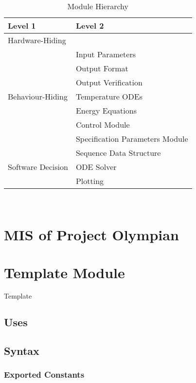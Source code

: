 \documentclass[12pt, titlepage]{article}
\begin{document}
\begin{table}[h!]
\centering
\begin{tabular}{p{} p{}}
\toprule
\textbf{Level 1} & \textbf{Level 2}\\
\midrule

{Hardware-Hiding} & ~ \\
\midrule

\multirow{7}{0.3\textwidth}{Behaviour-Hiding} & Input Parameters\\
& Output Format\\
& Output Verification\\
& Temperature ODEs\\
& Energy Equations\\ 
& Control Module\\
& Specification Parameters Module\\
\midrule

\multirow{3}{0.3\textwidth}{Software Decision} & {Sequence Data Structure}\\
& ODE Solver\\
& Plotting\\
\bottomrule

\end{tabular}
\caption{Module Hierarchy}
\label{TblMH}
\end{table}

\newpage
~\newpage

\section{MIS of Project Olympian} \label{Template} 

\section{Template Module}

Template

\subsection{Uses}

\subsection{Syntax}

\subsubsection{Exported Constants}
\end{document}
